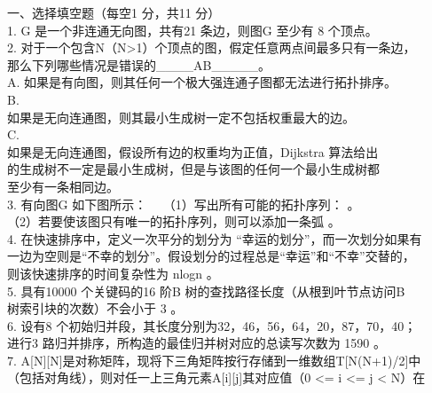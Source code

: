 
\begin{question}
一、选择填空题（每空1 分，共11 分）\\
1. G 是一个非连通无向图，共有21 条边，则图G 至少有  8  个顶点。\\
2. 对于一个包含N（N>1）个顶点的图，假定任意两点间最多只有一条边，\\
那么下列哪些情况是错误的\_\_\_\_AB\_\_\_\_\_。\\
A. 如果是有向图，则其任何一个极大强连通子图都无法进行拓扑排序。\\
B.\\
如果是无向连通图，则其最小生成树一定不包括权重最大的边。\\
C.\\
如果是无向连通图，假设所有边的权重均为正值，Dijkstra 算法给出\\
的生成树不一定是最小生成树，但是与该图的任何一个最小生成树都\\
至少有一条相同边。\\
3. 有向图G 如下图所示：\
\
（1）写出所有可能的拓扑序列： \underline{\hspace{8em}}。\\
（2）若要使该图只有唯一的拓扑序列，则可以添加一条弧 \underline{\hspace{8em}}。\\
4. 在快速排序中，定义一次平分的划分为 “幸运的划分”，而一次划分如果有\\
一边为空则是“不幸的划分”。假设划分的过程总是“幸运”和“不幸”交替的，\\
则该快速排序的时间复杂性为         nlogn       。\\
5. 具有10000 个关键码的16 阶B 树的查找路径长度（从根到叶节点访问B\\
树索引块的次数）不会小于   3    。\\
6. 设有8 个初始归并段，其长度分别为32，46，56，64，20，87，70，40；\\
进行3 路归并排序，所构造的最佳归并树对应的总读写次数为 1590   。\\
7. A[N][N]是对称矩阵，现将下三角矩阵按行存储到一维数组T[N(N+1)/2]中\\
（包括对角线），则对任一上三角元素A[i][j]其对应值（0 <= i <= j < N）在\\

\end{question}
